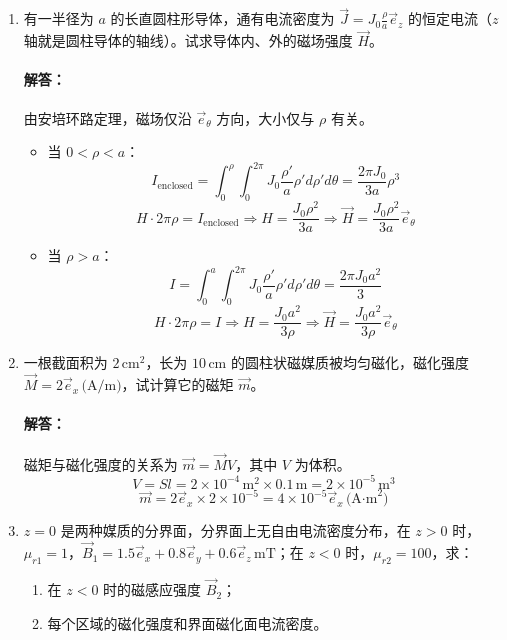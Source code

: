 \begin{enumerate}
    \item 有一半径为 $a$ 的长直圆柱形导体，通有电流密度为 $\vec{J}=J_0\frac{\rho}{a}\vec{e}_z$ 的恒定电流（$z$ 轴就是圆柱导体的轴线）。试求导体内、外的磁场强度 $\vec{H}$。

    \paragraph{解答：}
    由安培环路定理，磁场仅沿 $\vec{e}_\theta$ 方向，大小仅与 $\rho$ 有关。
    \begin{itemize}
        \item 当 $0<\rho<a$：
        \[
        I_{\text{enclosed}} = \int_0^\rho \int_0^{2\pi} J_0 \frac{\rho'}{a} \rho' d\rho' d\theta = \frac{2\pi J_0}{3a}\rho^3
        \]
        \[
        H \cdot 2\pi\rho = I_{\text{enclosed}} \Rightarrow H = \frac{J_0 \rho^2}{3a} \Rightarrow \vec{H} = \frac{J_0 \rho^2}{3a}\vec{e}_\theta
        \]
        \item 当 $\rho>a$：
        \[
        I = \int_0^a \int_0^{2\pi} J_0 \frac{\rho'}{a} \rho' d\rho' d\theta = \frac{2\pi J_0 a^2}{3}
        \]
        \[
        H \cdot 2\pi\rho = I \Rightarrow H = \frac{J_0 a^2}{3\rho} \Rightarrow \vec{H} = \frac{J_0 a^2}{3\rho}\vec{e}_\theta
        \]
    \end{itemize}

    \item 一根截面积为 $2\,\text{cm}^2$，长为 $10\,\text{cm}$ 的圆柱状磁媒质被均匀磁化，磁化强度 $\vec{M}=2\vec{e}_x\,\text{(A/m)}$，试计算它的磁矩 $\vec{m}$。

    \paragraph{解答：}
    磁矩与磁化强度的关系为 $\vec{m} = \vec{M} V$，其中 $V$ 为体积。
    \[
    V = S l = 2\times10^{-4}\,\text{m}^2 \times 0.1\,\text{m} = 2\times10^{-5}\,\text{m}^3
    \]
    \[
    \vec{m} = 2\vec{e}_x \times 2\times10^{-5} = 4\times10^{-5}\vec{e}_x\,\text{(A·m}^2\text{)}
    \]

    \item $z=0$ 是两种媒质的分界面，分界面上无自由电流密度分布，在 $z>0$ 时，$\mu_{r1}=1$，$\vec{B}_1=1.5\vec{e}_x+0.8\vec{e}_y+0.6\vec{e}_z\,\text{mT}$；在 $z<0$ 时，$\mu_{r2}=100$，求：
    \begin{enumerate}
        \item 在 $z<0$ 时的磁感应强度 $\vec{B}_2$；
        \item 每个区域的磁化强度和界面磁化面电流密度。
    \end{enumerate}


\end{enumerate}

